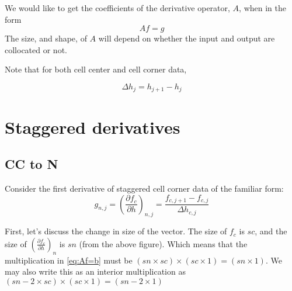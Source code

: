 \documentclass[11pt]{article}
\begin{document}
We would like to get the coefficients of the derivative operator, $A$, when in the form
\begin{equation} \label{eq:Af=b}
  Af = g
\end{equation}
The size, and shape, of $A$ will depend on whether the input and output are collocated or not.

Note that for both cell center and cell corner data,

\begin{equation}
  \Delta h_{j} = h_{j+1}-h_{j}
\end{equation}

\section{Staggered derivatives}
\subsection{CC to N}
Consider the first derivative of staggered cell corner data of the familiar form:
\begin{equation}
  g_{n,j} = \left( \frac{\partial f_{c}}{\partial h} \right)_{n,j} = \frac{f_{c,j+1}-f_{c,j}}{\Delta h_{c,j}}
\end{equation}

First, let's discuss the change in size of the vector. The size of $f_c$ is $sc$, and the size of $\left( \frac{\partial f_{c}}{\partial h} \right)_{n}$ is $sn$ (from the above figure). Which means that the multiplication in \ref{eq:Af=b} must be $(sn \times sc) \times (sc \times 1) = (sn \times 1)$. We may also write this as an interior multiplication as $(sn-2 \times sc) \times (sc \times 1) = (sn-2 \times 1)$
\end{document}
